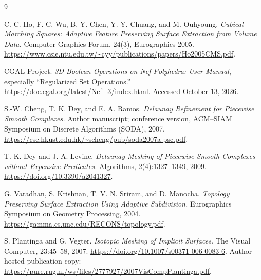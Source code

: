 \documentclass[11pt]{article}
\theoremstyle{definition}
\theoremstyle{remark}
\begin{document}
\begin{thebibliography}{9}

C.-C. Ho, F.-C. Wu, B.-Y. Chen, Y.-Y. Chuang, and M. Ouhyoung.
\emph{Cubical Marching Squares: Adaptive Feature Preserving Surface
Extraction from Volume Data.}
Computer Graphics Forum, 24(3), Eurographics 2005.
\url{https://www.csie.ntu.edu.tw/~cyy/publications/papers/Ho2005CMS.pdf}.

CGAL Project.
\emph{3D Boolean Operations on Nef Polyhedra: User Manual}, especially
``Regularized Set Operations.''
\url{https://doc.cgal.org/latest/Nef_3/index.html}.
Accessed October 13, 2026.

S.-W. Cheng, T. K. Dey, and E. A. Ramos.
\emph{Delaunay Refinement for Piecewise Smooth Complexes.}
Author manuscript; conference version, ACM--SIAM Symposium on Discrete
Algorithms (SODA), 2007.
\url{https://cse.hkust.edu.hk/~scheng/pub/soda2007a-psc.pdf}.

T. K. Dey and J. A. Levine.
\emph{Delaunay Meshing of Piecewise Smooth Complexes without Expensive
Predicates.}
Algorithms, 2(4):1327--1349, 2009.
\url{https://doi.org/10.3390/a2041327}.

G. Varadhan, S. Krishnan, T. V. N. Sriram, and D. Manocha.
\emph{Topology Preserving Surface Extraction Using Adaptive Subdivision.}
Eurographics Symposium on Geometry Processing, 2004.
\url{https://gamma.cs.unc.edu/RECONS/topology.pdf}.

S. Plantinga and G. Vegter.
\emph{Isotopic Meshing of Implicit Surfaces.}
The Visual Computer, 23:45--58, 2007.
\url{https://doi.org/10.1007/s00371-006-0083-6}.
Author-hosted publication copy:
\url{https://pure.rug.nl/ws/files/2777927/2007VisCompPlantinga.pdf}.

\end{thebibliography}
\end{document}
